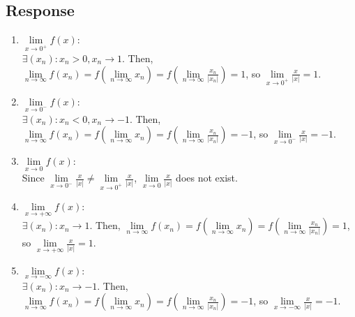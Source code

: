 \documentclass[13pt]{article}
\begin{document}
\subsection*{Response}
\begin{enumerate}[label=(\roman*)]
\item $\lim\limits_{x \to 0^+} f(x)$: \\
  $\exists (x_n) : x_n > 0, x_n
  \rightarrow 1$. Then, $\lim\limits_{n \to \infty} f(x_n) =
  f(\lim\limits_{n \to \infty} x_n) =
  f(\lim\limits_{n \to \infty} \frac{x_n}{|x_n|}) =
  1$, so $\lim\limits_{x \to 0^+}
  \frac{x}{|x|} = 1$.

\item $\lim\limits_{x \to 0^-} f(x)$: \\
  $\exists (x_n) : x_n < 0, x_n
  \rightarrow -1$. Then, $\lim\limits_{n \to \infty} f(x_n) =
  f(\lim\limits_{n \to \infty} x_n) =
  f(\lim\limits_{n \to \infty} \frac{x_n}{|x_n|}) =
  -1$, so $\lim\limits_{x \to 0^-} 
  \frac{x}{|x|} = -1$.

\item $\lim\limits_{x \to 0} f(x)$: \\
  Since $\lim\limits_{x \to 0^-}
  \frac{x}{|x|} \neq \lim\limits_{x \to 0^+} \frac{x}{|x|}$, $\lim\limits_{x \to 0}
  \frac{x}{|x|}$ does not exist.

\item $\lim\limits_{x \to +\infty} f(x)$: \\
  $\exists (x_n) : x_n
  \rightarrow 1$. Then, $\lim\limits_{n \to \infty} f(x_n) =
  f(\lim\limits_{n \to \infty} x_n) =
  f(\lim\limits_{n \to \infty} \frac{x_n}{|x_n|}) =
  1$, so $\lim\limits_{x \to +\infty} 
  \frac{x}{|x|} = 1$.

\item $\lim\limits_{x \to -\infty} f(x)$: \\
  $\exists (x_n) : x_n
  \rightarrow -1$. Then, $\lim\limits_{n \to \infty} f(x_n) =
  f(\lim\limits_{n \to \infty} x_n) =
  f(\lim\limits_{n \to \infty} \frac{x_n}{|x_n|}) =
  -1$, so $\lim\limits_{x \to -\infty} 
  \frac{x}{|x|} = -1$.
\end{enumerate}
\end{document}

